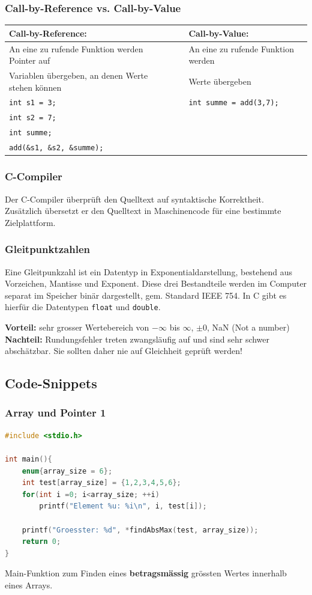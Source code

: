 		\subsubsection{Call-by-Reference vs. Call-by-Value}
			\begin{tabular}{|ll|l|}
				\hline
				\textbf{Call-by-Reference:} & & \textbf{Call-by-Value:}\\
				\hline
				An eine zu rufende Funktion werden Pointer auf & & An eine zu rufende Funktion werden \\
				Variablen übergeben, an denen Werte stehen können & & Werte übergeben \\
				\verb|int s1 = 3;| & & \verb|int summe = add(3,7);|\\
				\verb|int s2 = 7;| & & \\
				\verb|int summe;| & & \\
				\verb|add(&s1, &s2, &summe);| & & \\
				\hline
			\end{tabular}
			
		\subsubsection{C-Compiler}
			Der C-Compiler überprüft den Quelltext auf syntaktische Korrektheit.\\
			Zusätzlich übersetzt er den Quelltext in Maschinencode für eine bestimmte Zielplattform.

		\subsubsection{Gleitpunktzahlen}
			Eine Gleitpunkzahl ist ein Datentyp in Exponentialdarstellung, bestehend aus Vorzeichen, Mantisse und Exponent.
			Diese drei Bestandteile werden im Computer separat im Speicher binär dargestellt, gem. Standard IEEE 754.
			In C gibt es hierfür die Datentypen \verb|float| und \verb|double|.

			\textbf{Vorteil:} sehr grosser Wertebereich von $-\infty$ bis $\infty$, $\pm 0$, NaN (Not a number)\\
			\textbf{Nachteil:} Rundungsfehler treten zwangsläufig auf und sind sehr schwer abschätzbar.
			Sie sollten daher nie auf Gleichheit geprüft werden!
		
	\subsection{Code-Snippets}
		\subsubsection{Array und Pointer 1}
			\begin{lstlisting}[language=C]
#include <stdio.h>

int main(){
	enum{array_size = 6};
	int test[array_size] = {1,2,3,4,5,6};
	for(int i =0; i<array_size; ++i)
		printf("Element %u: %i\n", i, test[i]);
	
	printf("Groesster: %d", *findAbsMax(test, array_size));
	return 0;
}
			\end{lstlisting}
			Main-Funktion zum Finden eines \textbf{betragsmässig} grössten Wertes innerhalb eines Arrays.

